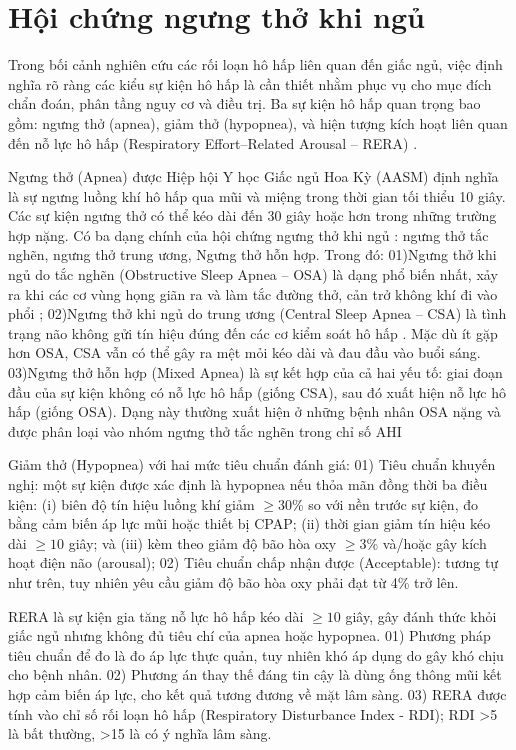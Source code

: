 
\section{Hội chứng ngưng thở khi ngủ}

Trong bối cảnh nghiên cứu các rối loạn hô hấp liên quan đến giấc ngủ, 
việc định nghĩa rõ ràng các kiểu sự kiện hô hấp là 
cần thiết nhằm phục vụ cho mục đích chẩn đoán, 
phân tầng nguy cơ và điều trị. 
Ba sự kiện hô hấp quan trọng bao gồm: ngưng thở (apnea), giảm thở (hypopnea), và hiện tượng kích hoạt liên quan đến nỗ lực hô hấp
(Respiratory Effort–Related Arousal – RERA) \cite{berry2012scoring}.

Ngưng thở (Apnea) được Hiệp hội Y học Giấc ngủ Hoa Kỳ (AASM) định nghĩa là 
sự ngưng luồng khí hô hấp qua mũi và miệng trong thời gian tối thiểu 10 giây. 
Các sự kiện ngưng thở có thể kéo dài đến 30 giây hoặc hơn trong những trường hợp nặng.
Có ba dạng chính của hội chứng ngưng thở khi ngủ \cite{ThaySYOSA}: ngưng thở tắc nghẽn, ngưng thở trung ương, Ngưng thở hỗn hợp. Trong đó: 
01)Ngưng thở khi ngủ do tắc nghẽn (Obstructive Sleep Apnea – OSA) là dạng phổ biến nhất, xảy ra khi các cơ vùng họng giãn ra và làm tắc đường thở, cản trở không khí đi vào phổi \cite{osa_summary}; 
02)Ngưng thở khi ngủ do trung ương (Central Sleep Apnea – CSA) là tình trạng não không gửi tín hiệu đúng đến các cơ kiểm soát hô hấp \cite{eckert2007csa}. Mặc dù ít gặp hơn OSA, CSA vẫn có thể gây ra mệt mỏi kéo dài và đau đầu vào buổi sáng.
03)Ngưng thở hỗn hợp (Mixed Apnea) là sự kết hợp của cả hai yếu tố: giai đoạn đầu của sự kiện không có nỗ lực hô hấp (giống CSA), sau đó xuất hiện nỗ lực hô hấp (giống OSA). 
Dạng này thường xuất hiện ở những bệnh nhân OSA nặng và được phân loại vào nhóm ngưng thở tắc nghẽn trong chỉ số AHI

Giảm thở (Hypopnea) với hai mức tiêu chuẩn đánh giá: 
01) Tiêu chuẩn khuyến nghị: một sự kiện được xác định 
là hypopnea nếu thỏa mãn đồng thời ba điều kiện: 
(i) biên độ tín hiệu luồng khí giảm $\geq 30$\% so với nền trước sự kiện, 
đo bằng cảm biến áp lực mũi hoặc thiết bị CPAP; 
(ii) thời gian giảm tín hiệu kéo dài $\geq 10$ giây; 
và (iii) kèm theo giảm độ bão hòa oxy $\geq 3$\% và/hoặc gây kích hoạt điện não (arousal); 
02) Tiêu chuẩn chấp nhận được (Acceptable): tương tự như trên, tuy nhiên yêu cầu giảm độ bão hòa 
oxy phải đạt từ 4\% trở lên.

RERA là sự kiện gia tăng nỗ lực hô hấp kéo dài $\geq 10$ giây, 
gây đánh thức khỏi giấc ngủ nhưng không đủ tiêu chí của apnea hoặc hypopnea. 
01) Phương pháp tiêu chuẩn để đo là đo áp lực thực quản, tuy nhiên khó áp dụng do gây khó chịu cho bệnh nhân. 
02) Phương án thay thế đáng tin cậy là dùng ống thông mũi kết hợp cảm biến áp lực, 
cho kết quả tương đương về mặt lâm sàng. 
03) RERA được tính vào chỉ số rối loạn hô hấp (Respiratory Disturbance Index - RDI); 
RDI >5 là bất thường, >15 là có ý nghĩa lâm sàng.

